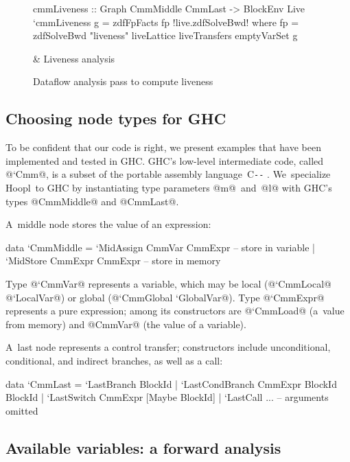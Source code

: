 \documentclass[blockstyle,preprint,natbib,nocopyrightspace]{sigplanconf}
\newcommand\ourlib{Hoopl}  %
\let\cite\citep
\newcommand\PAL{\mbox{C{\texttt{-{}-}}}}
\newcommand\figlabel[1]{\label{fig:#1}}
\begin{document}
\begin{figure*}
\begin{codetable}
\T
\begin{code}
cmmLiveness :: Graph CmmMiddle CmmLast -> BlockEnv Live
`cmmLiveness g = zdfFpFacts fp
!live.zdfSolveBwd!   where fp = zdfSolveBwd "liveness" liveLattice liveTransfers emptyVarSet g
\end{code}
\B
& Liveness \mbox{analysis}\\
\end{codetable}
\caption{Dataflow analysis pass to compute liveness}
\figlabel{liveness-all}
\figlabel{liveness}
\figlabel{live-lattice}
\figlabel{live-transfers}
\figlabel{live-running}
\end{figure*}
%
%


\subsection{Choosing node types for GHC}

To be confident that our code is right,
we present examples that
have been implemented and tested in GHC.  
GHC's low-level intermediate code, called @`Cmm@, is a 
 subset of 
the portable assembly language~{\PAL}
\cite{peyton-jones-ramsey:exceptions}.
We~specialize \ourlib\ to GHC by instantiating type parameters
@m@~and~@l@ with GHC's types @CmmMiddle@ and @CmmLast@.

A~middle node stores the value of an expression:
\begin{code}
data `CmmMiddle 
  = `MidAssign CmmVar  CmmExpr -- store in variable
  | `MidStore  CmmExpr CmmExpr -- store in memory
\end{code}
Type @`CmmVar@ represents a variable, which may be local (@`CmmLocal@
@`LocalVar@) or global 
(@`CmmGlobal `GlobalVar@). %
Type @`CmmExpr@ represents a pure expression; 
among its constructors are @`CmmLoad@ (a~value from memory)
and @CmmVar@ (the value of a variable).

A~last node represents a control transfer; constructors include
unconditional, conditional, and indirect branches, as well as a call:
\begin{code}
data `CmmLast
  = `LastBranch     BlockId
  | `LastCondBranch CmmExpr BlockId BlockId
  | `LastSwitch     CmmExpr [Maybe BlockId]
  | `LastCall ...     -- arguments omitted
\end{code}






\subsection{Available variables: a forward analysis} 
\end{document}
